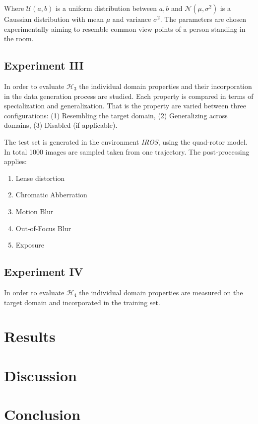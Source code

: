 Where $ \mathcal{U}(a,b)$ is a uniform distribution between $a,b$ and $\mathcal{N}(\mu,\sigma^2)$ is a Gaussian distribution with mean $\mu$ and variance $\sigma^2$.
The parameters are chosen experimentally aiming to resemble common view points of a person standing in the room.

\subsection{Experiment III}

In order to evaluate $\mathcal{H}_3$ the individual domain properties and their incorporation in the data generation process are studied. Each property is compared in terms of specialization and generalization. That is the property are varied between three configurations: (1) Resembling the target domain, (2) Generalizing across domains, (3) Disabled (if applicable).

The test set is generated in the environment \textit{IROS}, using the quad-rotor model. In total 1000 images are sampled taken from one trajectory. The post-processing applies:
\begin{enumerate}
	\item Lense distortion
	\item Chromatic Abberration
	\item Motion Blur
	\item Out-of-Focus Blur
	\item Exposure
\end{enumerate}

\subsection{Experiment IV}

In order to evaluate $\mathcal{H}_4$ the individual domain properties are measured on the target domain and incorporated in the training set.


\section{Results}
\label{sec:training:results}

\section{Discussion}
\label{sec:training:discussion}

\section{Conclusion}
\label{sec:training:conclusion}


